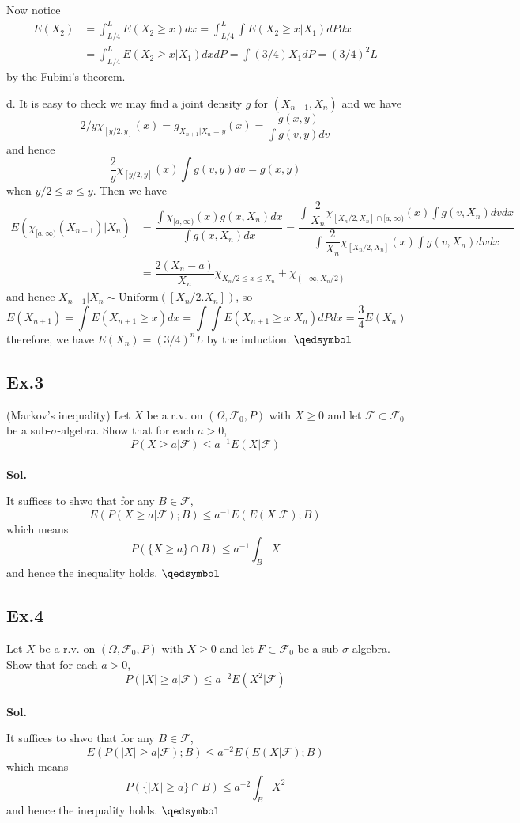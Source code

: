 \documentclass[lang=en,11pt,a4paper,citestyle =authoryear]{elegantpaper}
\newcommand{\prvd}{$\hfill \qedsymbol$}
\newcommand{\F}{\mathcal{F}}
\begin{document}
Now notice
\[
\begin{aligned}
E(X_2) &= \int^L_{L/4} E(X_2\geq x) dx  = \int_{L/4}^L \int E(X_2\geq x|X_1) dP dx \\ &= \int_{L/4}^L E(X_2\geq x|X_1) dx dP = \int (3/4)X_1 dP = (3/4)^2 L
\end{aligned}
\]
by the Fubini's theorem.\par
d. It is easy to check we may find a joint density $g$ for $(X_{n+1},X_{n})$ and we have
\[
2/y\chi_{[y/2,y]}(x) =  g_{X_{n+1}|X_{n} = y}(x) = \dfrac{g(x,y)}{\int g(v,y)dv}
\] and hence
\[\dfrac{2}{y}\chi_{[y/2,y]}(x)\int g(v,y)dv = g(x,y)\]
when $ y/2 \leq x \leq y$. Then we have
\[
\begin{aligned}
    E(\chi_{[a,\infty)}(X_{n+1})|X_{n}) &= \dfrac{\int \chi_{[a,\infty)}(x)g(x,X_n)dx}{\int g(x,X_n)dx} = \dfrac{\int \dfrac{2}{X_n} \chi_{[X_n/2,X_n]\cap [a,\infty)}(x)\int g(v,X_n)dv dx}{\int \dfrac{2}{X_n} \chi_{[X_n/2,X_n]}(x)\int g(v,X_n)dv dx} \\
    & = \dfrac{2(X_n-a)}{X_n}\chi_{X_n/2\leq x\leq X_n} + \chi_{(-\infty,X_n/2)}
\end{aligned}
\]
and hence
$X_{n+1}|X_n \sim \text{Uniform}([X_n/2. X_n])$, so \[E(X_{n+1}) = \int E(X_{n+1}\geq x)dx = \int \int E(X_{n+1}\geq x|X_n) dP dx = \dfrac{3}{4}E(X_n)\]
therefore, we have $E(X_n) = (3/4)^n L$ by the induction.
\prvd
\vspace{0.5em}

\subsection*{Ex.3} 
(Markov's inequality) Let $X$ be a r.v. on $(\Omega,\F_0,P)$ with $X \geq 0$ and let $\F\subset\F_0$ be a sub-$\sigma$-algebra. Show that for each $a > 0$,
\[ P(X\geq a|\F) \leq a^{-1}E(X|\F)\]
\vspace{0.5em}\\
\textbf{Sol.} \par
It suffices to shwo that for any $B\in\F$, 
\[
E(P(X\geq a|\F);B) \leq a^{-1}E(E(X|\F);B)
\]
which means
\[
P(\{X\geq a\}\cap B) \leq a^{-1} \int_B X
\]
and hence the inequality holds.
\prvd
\vspace{0.5em}

\subsection*{Ex.4} 
Let $X$ be a r.v. on $(\Omega, \F_0, P)$ with $X \geq 0$ and let $F\subset\F_0$ be a sub-$\sigma$-algebra. Show that for each $a>0$,
\[
P(|X|\geq a|\F) \leq a^{-2}E(X^2|\F)
\]
\vspace{0.5em}\\
\textbf{Sol.} \par
It suffices to shwo that for any $B\in\F$, 
\[
E(P(|X|\geq a|\F);B) \leq a^{-2}E(E(X|\F);B)
\]
which means
\[
P(\{|X|\geq a\}\cap B) \leq a^{-2} \int_B X^2
\]
and hence the inequality holds.
\prvd
\vspace{0.5em}
\end{document}
